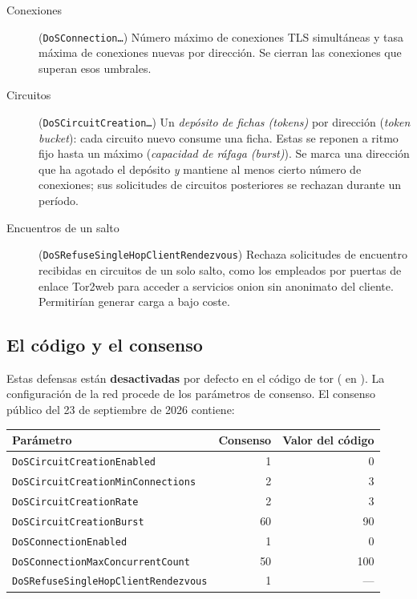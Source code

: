 \begin{description}
  \item[Conexiones] (\texttt{DoSConnection\ldots}) Número máximo de conexiones TLS simultáneas y tasa máxima de conexiones nuevas por dirección. Se cierran las conexiones que superan esos umbrales.
  \item[Circuitos] (\texttt{DoSCircuitCreation\ldots}) Un \emph{depósito de fichas (tokens)} por dirección (\emph{token bucket}): cada circuito nuevo consume una ficha. Estas se reponen a ritmo fijo hasta un máximo (\emph{capacidad de ráfaga (burst)}). Se marca una dirección que ha agotado el depósito \emph{y} mantiene al menos cierto número de conexiones; sus solicitudes de circuitos posteriores se rechazan durante un período.
  \item[Encuentros de un salto] (\texttt{DoSRefuseSingleHopClientRendezvous}) Rechaza solicitudes de encuentro recibidas en circuitos de un solo salto, como los empleados por puertas de enlace Tor2web para acceder a servicios onion sin anonimato del cliente. Permitirían generar carga a bajo coste.
\end{description}

\subsection{El código y el consenso}

Estas defensas están \textbf{desactivadas} por defecto en el código de tor ( en ). La configuración de la red procede de los parámetros de consenso. El consenso público del 23 de septiembre de 2026 contiene:
\begin{center}\small
\begin{tabular}{lrr}
\toprule
Parámetro & Consenso & Valor del código \\
\midrule
\texttt{DoSCircuitCreationEnabled} & 1 & 0 \\
\texttt{DoSCircuitCreationMinConnections} & 2 & 3 \\
\texttt{DoSCircuitCreationRate} & 2 & 3 \\
\texttt{DoSCircuitCreationBurst} & 60 & 90 \\
\texttt{DoSConnectionEnabled} & 1 & 0 \\
\texttt{DoSConnectionMaxConcurrentCount} & 50 & 100 \\
\texttt{DoSRefuseSingleHopClientRendezvous} & 1 & --- \\
\bottomrule
\end{tabular}
\end{center}

